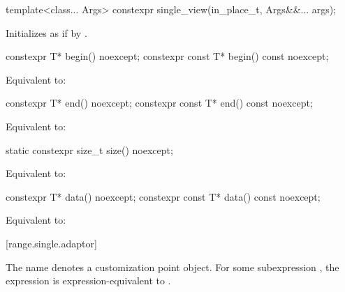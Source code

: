 %
\begin{itemdecl}
template<class... Args>
constexpr single_view(in_place_t, Args&&... args);
\end{itemdecl}

\begin{itemdescr}
\pnum
\effects Initializes  as if by
.
\end{itemdescr}

%
\begin{itemdecl}
constexpr T* begin() noexcept;
constexpr const T* begin() const noexcept;
\end{itemdecl}

\begin{itemdescr}
\pnum
\effects Equivalent to: 
\end{itemdescr}

%
\begin{itemdecl}
constexpr T* end() noexcept;
constexpr const T* end() const noexcept;
\end{itemdecl}

\begin{itemdescr}
\pnum
\effects Equivalent to: 
\end{itemdescr}

%
\begin{itemdecl}
static constexpr size_t size() noexcept;
\end{itemdecl}

\begin{itemdescr}
\pnum
\effects Equivalent to: 
\end{itemdescr}

%
\begin{itemdecl}
constexpr T* data() noexcept;
constexpr const T* data() const noexcept;
\end{itemdecl}

\begin{itemdescr}
\pnum
\effects Equivalent to: 
\end{itemdescr}

[range.single.adaptor]{}

\pnum
The name  denotes a
customization point object.
For some subexpression , the expression
 is expression-equivalent to
.

